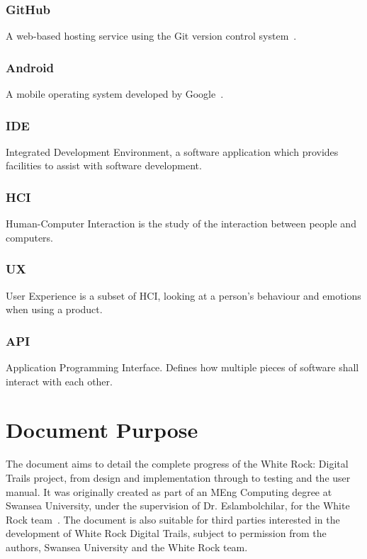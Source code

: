 \documentclass[11pt,a4paper]{report}
\begin{document}
\subsubsection{GitHub}
A web-based hosting service using the Git version control system~\cite{github}.

\subsubsection{Android}
A mobile operating system developed by Google~\cite{android}. 

\subsubsection{IDE}
Integrated Development Environment, a software application which provides facilities to assist with software development.

\subsubsection{HCI}
Human-Computer Interaction is the study of the interaction between people and computers.

\subsubsection{UX}
User Experience is a subset of HCI, looking at a person's behaviour and emotions when using a product.

\subsubsection{API}
Application Programming Interface. Defines how multiple pieces of software shall interact with each other.

\section{Document Purpose}
The document aims to detail the complete progress of the White Rock: Digital Trails project, from design and implementation through to testing and the user manual. It was originally created as part of an MEng Computing degree at Swansea University, under the supervision of Dr. Eslambolchilar, for the White Rock team~\cite{whiterock}. The document is also suitable for third parties interested in the development of White Rock Digital Trails, subject to permission from the authors, Swansea University and the White Rock team.
\end{document}
